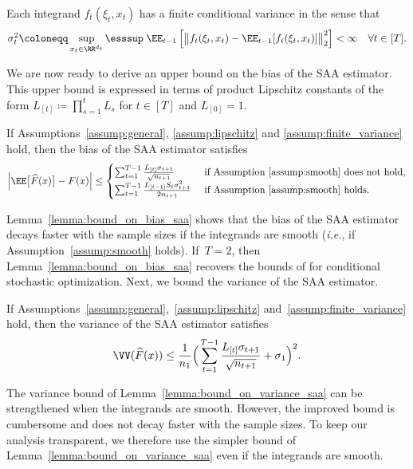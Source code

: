 \documentclass[11pt]{article}
\let\hat\widehat
\begin{document}
\begin{assumption}\label{assump:finite_variance}
    Each integrand $f_t(\xi_t,x_t)$ has a finite conditional variance in the sense that $$\sigma_t^2\coloneqq\sup_{x_t\in\RR^{d_t}}\esssup \; \EE_{t-1} \left[ \big\|f_t(\xi_t,x_t) - \EE_{t-1}[f_t(\xi_t,x_t)] \big\|^2_2 \right]<\infty\quad\forall t\in[T].$$
\end{assumption}

We are now ready to derive an upper bound on the bias of the SAA estimator. This upper bound is expressed in terms of product Lipschitz constants of the form $L_{[t]}\coloneqq\prod_{s=1}^t L_s$ for $t\in[T]$ and $L_{[0]}=1$.

\begin{lemma}
\label{lemma:bound_on_bias_saa}
If Assumptions~\ref{assump:general}, \ref{assump:lipschitz} and \ref{assump:finite_variance} hold, then the bias of the SAA estimator satisfies 
\begin{align*}
    \left|  \EE \big[ \hat{F}(x)\big] - F(x) \right| \leq \begin{cases}
    \sum_{t=1}^{T-1} \frac{L_{[t]}\sigma_{t+1}}{\sqrt{n_{t+1}}} \; &\text{if Assumption~\ref{assump:smooth} does not hold}, \\ 
    \sum_{t=1}^{T-1}  \frac{L_{[t-1]}S_t\sigma_{t+1}^2}{2n_{t+1}} \; &\text{if Assumption~\ref{assump:smooth} holds}.
    \end{cases}
    \end{align*}
\end{lemma}

Lemma~\ref{lemma:bound_on_bias_saa} shows that the bias of the SAA estimator decays faster with the sample sizes if the integrands are smooth ({\em i.e.}, if Assumption~\ref{assump:smooth} holds). If~$T=2$, then Lemma~\ref{lemma:bound_on_bias_saa} recovers the bounds of \citep[Lemma~3.1]{hu2020sample} for conditional stochastic optimization. Next, we bound the variance of the SAA estimator.

\begin{lemma}
\label{lemma:bound_on_variance_saa} 
If Assumptions~\ref{assump:general},~\ref{assump:lipschitz} and~\ref{assump:finite_variance} hold, then the variance of the SAA estimator satisfies
    \begin{align*}
        \VV(\hat{F}(x)) \leq \frac{1}{n_1}\Big(\sum_{t=1}^{T-1} \frac{L_{[t]} \sigma_{t+1}}{\sqrt{n_{t+1}}} + \sigma_1\Big)^2.
    \end{align*}
\end{lemma}
\begin{rem}\label{remark:bound_on_variance_saa}
   The variance bound of Lemma~\ref{lemma:bound_on_variance_saa} can be strengthened when the integrands are smooth. However, the improved bound is cumbersome and does not decay faster with the sample sizes. To keep our analysis transparent, we therefore use the simpler bound of Lemma~\ref{lemma:bound_on_variance_saa} even if the integrands are smooth.
\end{rem}
\end{document}
